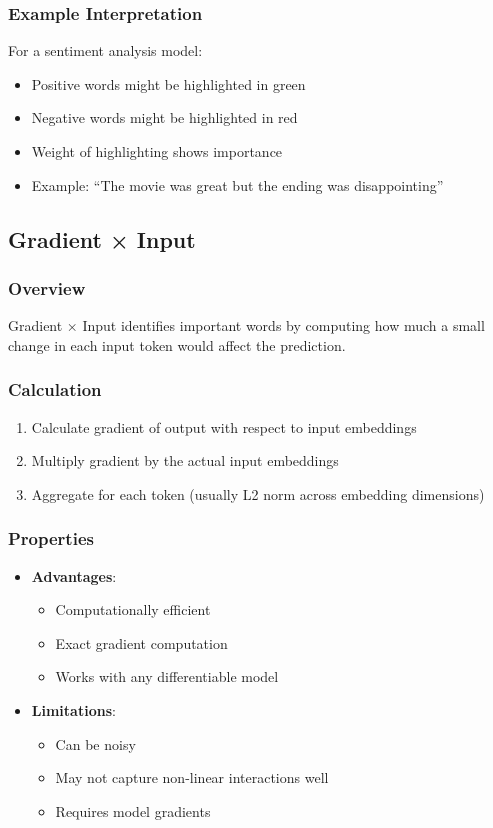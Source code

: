 \documentclass{article}
\begin{document}
\subsubsection{Example Interpretation}
For a sentiment analysis model:
\begin{itemize}
    \item Positive words might be highlighted in green
    \item Negative words might be highlighted in red
    \item Weight of highlighting shows importance
    \item Example: ``The movie was {\color{green}great} but the ending was {\color{red}disappointing}''
\end{itemize}

\subsection{Gradient × Input}

\subsubsection{Overview}
Gradient × Input identifies important words by computing how much a small change in each input token would affect the prediction.

\subsubsection{Calculation}
\begin{enumerate}
    \item Calculate gradient of output with respect to input embeddings
    \item Multiply gradient by the actual input embeddings
    \item Aggregate for each token (usually L2 norm across embedding dimensions)
\end{enumerate}

\subsubsection{Properties}
\begin{itemize}
    \item \textbf{Advantages}:
        \begin{itemize}
            \item Computationally efficient
            \item Exact gradient computation
            \item Works with any differentiable model
        \end{itemize}
    \item \textbf{Limitations}:
        \begin{itemize}
            \item Can be noisy
            \item May not capture non-linear interactions well
            \item Requires model gradients
        \end{itemize}
\end{itemize}
\end{document}
